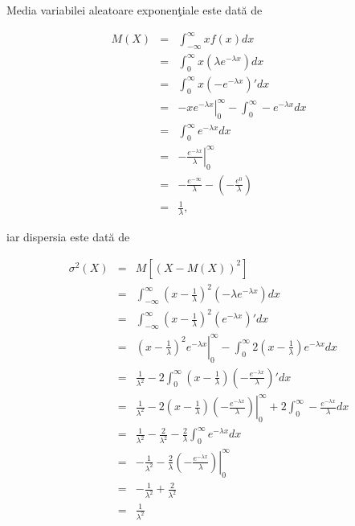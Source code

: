 \documentclass{article}
\begin{document}
Media variabilei aleatoare exponenţiale este dată de

\begin{eqnarray*}
	M(X) &=& \int_{-\infty}^\infty x f(x) dx\\
	&=& \int_0^\infty x \left(\lambda e^{-\lambda x} \right) dx \\
	&=& \int_0^\infty x \left(-e^{-\lambda x} \right)' dx \\
	&=& \left. -x e^{-\lambda x} \right|_0^\infty - \int_0^\infty -e^{-\lambda x} dx \\
	&=& \int_0^\infty e^{-\lambda x} dx \\
	&=& \left. -\frac{e^{-\lambda x}}{\lambda} \right|_0^\infty \\
	&=& -\frac{e^{-\infty}}{\lambda} - \left( -\frac{e^0}{\lambda} \right) \\
	&=& \frac{1}{\lambda},
\end{eqnarray*}

iar dispersia este dată de

\begin{eqnarray*}
	\sigma^2(X) &=& M \left[ (X - M(X))^2 \right] \\
	&=& \int_{-\infty}^\infty \left( x - \frac{1}{\lambda} \right)^2 (-\lambda e^{-\lambda x}) dx \\
	&=& \int_{-\infty}^\infty \left( x - \frac{1}{\lambda} \right)^2 (e^{-\lambda x})' dx \\
	&=& \left. \left(x - \frac{1}{\lambda}\right)^2 e^{-\lambda x} \right|_0^\infty - \int_0^\infty 2\left(x - \frac{1}{\lambda}\right) e^{-\lambda x} dx \\
	&=& \frac{1}{\lambda^2} - 2\int_0^\infty \left(x - \frac{1}{\lambda}\right) \left(-\frac{e^{-\lambda x}}{\lambda}\right)'dx \\
	&=& \frac{1}{\lambda^2} - \left.2 \left(x - \frac{1}{\lambda}\right)\left(-\frac{e^{-\lambda x}}{\lambda}\right)\right|_0^\infty + 2\int_0^\infty -\frac{e^{-\lambda x}}{\lambda} dx \\
	&=& \frac{1}{\lambda^2} - \frac{2}{\lambda^2} - \frac{2}{\lambda} \int_0^\infty e^{-\lambda x} dx\\
	&=& -\frac{1}{\lambda^2} - \frac{2}{\lambda} \left.\left(-\frac{e^{-\lambda x}}{\lambda}\right)\right|_0^\infty \\
	&=& -\frac{1}{\lambda^2}+\frac{2}{\lambda^2} \\
	&=& \frac{1}{\lambda^2}
\end{eqnarray*}
\end{document}

